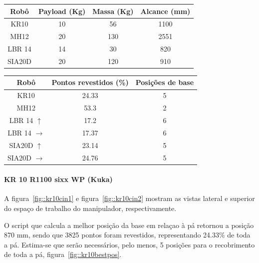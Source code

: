 \begin{center}
\begin{tabular}{  c | c | c | c  }
  \hline
  \textbf{Robô} & \textbf{Payload (Kg)} & \textbf{Massa (Kg)} & \textbf{Alcance
  (mm)} \\ \hline 
  KR10 & 10 & 56 & 1100 \\ \hline
  MH12 & 20 & 130 & 2551  \\ \hline
  LBR 14 & 14 & 30 & 820 \\ \hline
  SIA20D & 20 & 120 &  910 \\
  \hline
\end{tabular}
\label{tab::robocarac}
\end{center}

\begin{center}
\begin{tabular}{  c | c | c }
  \hline
  \textbf{Robô} & \textbf{Pontos revestidos (\%)} & \textbf{Posições de base} \\ \hline 
  KR10 & 24.33 & 5\\ \hline 
  MH12 & 53.3 & 2   \\ \hline
  LBR 14 $\uparrow$ & 17.2 & 6 \\ \hline
  LBR 14 $\rightarrow$ & 17.37 & 6 \\ \hline
  SIA20D $\uparrow$ & 23.14 & 5 \\ \hline
  SIA20D $\rightarrow$ & 24.76 & 5 \\ 
  \hline
\end{tabular}
\label{tab::robocin}
\end{center}

\paragraph{KR 10 R1100 sixx WP (Kuka)}
A figura~\ref{fig::kr10cin1} e figura~\ref{fig::kr10cin2} mostram as vistas
lateral e superior do espaço de trabalho do manipulador, respectivamente.

O script que calcula a melhor posição da base em relaçao à pá retornou a posição
870 mm, sendo que 3825 pontos foram revestidos, representando 24.33\% de toda a
pá. Estima-se que serão necessários, pelo menos, 5 posições para o recobrimento
de toda a pá, figura~\ref{fig::kr10bestpos}.



